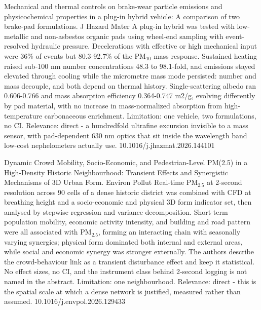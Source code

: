 \documentclass[10pt]{article}
\begin{document}
{Mechanical and thermal controls on brake-wear particle emissions and physicochemical properties in a plug-in hybrid vehicle: A comparison of two brake-pad formulations.}
{J Hazard Mater}
{A plug-in hybrid was tested with low-metallic and non-asbestos organic pads using wheel-end sampling with event-resolved hydraulic pressure. Decelerations with effective or high mechanical input were 36\% of events but 80.3-92.7\% of the PM$_{10}$ mass response. Sustained heating raised sub-100 nm number concentrations 48.3 to 98.1-fold, and emissions stayed elevated through cooling while the micrometre mass mode persisted: number and mass decouple, and both depend on thermal history. Single-scattering albedo ran 0.606-0.766 and mass absorption efficiency 0.364-0.747 m2/g, evolving differently by pad material, with no increase in mass-normalized absorption from high-temperature carbonaceous enrichment. Limitation: one vehicle, two formulations, no CI. Relevance: direct - a hundredfold ultrafine excursion invisible to a mass sensor, with pad-dependent 630 nm optics that sit inside the wavelength band low-cost nephelometers actually use.}
{10.1016/j.jhazmat.2026.144101}

{Dynamic Crowd Mobility, Socio-Economic, and Pedestrian-Level PM(2.5) in a High-Density Historic Neighbourhood: Transient Effects and Synergistic Mechanisms of 3D Urban Form.}
{Environ Pollut}
{Real-time PM$_{2.5}$ at 2-second resolution across 90 cells of a dense historic district was combined with CFD at breathing height and a socio-economic and physical 3D form indicator set, then analysed by stepwise regression and variance decomposition. Short-term population mobility, economic activity intensity, and building and road pattern were all associated with PM$_{2.5}$, forming an interacting chain with seasonally varying synergies; physical form dominated both internal and external areas, while social and economic synergy was stronger externally. The authors describe the crowd-behaviour link as a transient disturbance effect and keep it statistical. No effect sizes, no CI, and the instrument class behind 2-second logging is not named in the abstract. Limitation: one neighbourhood. Relevance: direct - this is the spatial scale at which a dense network is justified, measured rather than assumed.}
{10.1016/j.envpol.2026.129433}
\end{document}
